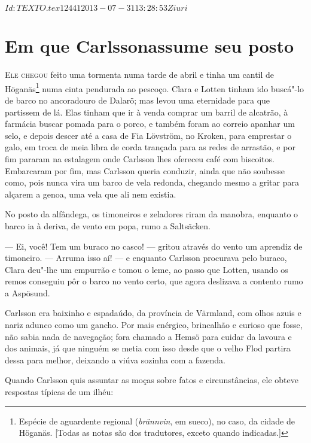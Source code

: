 \SVN $Id: TEXTO.tex 12441 2013-07-31 13:28:53Z iuri $

\chapter[Em que Carlsson assume seu posto\ldots]{Em que Carlsson\break assume seu posto}
 

\textsc{Ele chegou} feito uma tormenta numa tarde de abril e tinha um cantil de
Höganäs\footnote{ Espécie de aguardente regional (\textit{brännvin}, em sueco),  
no caso, da cidade de Höganäs. [Todas as notas são dos tradutores, exceto quando indicadas.]} 
numa cinta pendurada ao pescoço. Clara e Lotten tinham ido buscá"-lo de
barco no ancoradouro de Dalarö; mas levou uma eternidade para que partissem de
lá. Elas tinham que ir à venda comprar um barril de alcatrão, à farmácia buscar
pomada para o porco, e também foram ao correio apanhar um selo, e depois descer
até a casa de Fia Lövström, no Kroken, para emprestar o galo, em troca de meia
libra de corda trançada para as redes de arrastão, e por fim pararam na
estalagem onde Carlsson lhes ofereceu café com biscoitos. Embarcaram por fim,
mas Carlsson queria conduzir, ainda que não soubesse como, pois nunca vira um barco de vela
redonda, chegando mesmo a gritar para alçarem a genoa, uma vela que ali nem existia.

No posto da alfândega, os timoneiros e zeladores riram da manobra, enquanto o
barco ia à deriva, de vento em popa, rumo a Saltsäcken.

--- Ei, você! Tem um buraco no casco! --- gritou através do vento um aprendiz de
timoneiro. --- Arruma isso aí! --- e enquanto Carlsson procurava pelo buraco, Clara
deu"-lhe um empurrão e tomou o leme, ao passo que Lotten, usando os remos conseguiu
pôr o barco no vento certo, que agora deslizava a contento rumo a Aspösund.

Carlsson era baixinho e espadaúdo, da província de Värmland, com olhos azuis e
nariz adunco como um gancho. Por mais enérgico, brincalhão e curioso que fosse,
não sabia nada de navegação; fora chamado a Hemsö para cuidar da lavoura e
dos animais, já que ninguém se metia com isso desde que o velho Flod partira dessa
para melhor, deixando a viúva sozinha com a fazenda.

Quando Carlsson quis assuntar as moças sobre fatos e circunstâncias, ele
obteve respostas típicas de um ilhéu:

